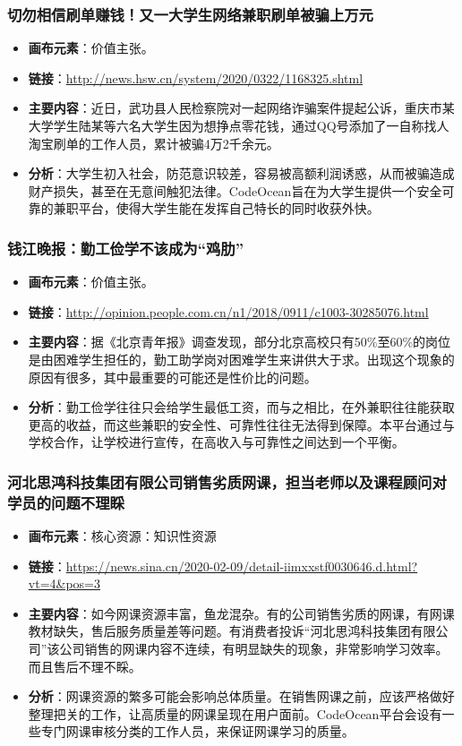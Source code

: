 \documentclass[a4paper]{ctexart}
\begin{document}
\subsubsection{切勿相信刷单赚钱！又一大学生网络兼职刷单被骗上万元}
\begin{itemize}
  \item \textbf{画布元素}：价值主张。
  \item \textbf{链接}：\url{http://news.hsw.cn/system/2020/0322/1168325.shtml}
  \item \textbf{主要内容}：近日，武功县人民检察院对一起网络诈骗案件提起公诉，重庆市某大学学生陆某等六名大学生因为想挣点零花钱，通过QQ号添加了一自称找人淘宝刷单的工作人员，累计被骗4万2千余元。
  \item \textbf{分析}：大学生初入社会，防范意识较差，容易被高额利润诱惑，从而被骗造成财产损失，甚至在无意间触犯法律。CodeOcean旨在为大学生提供一个安全可靠的兼职平台，使得大学生能在发挥自己特长的同时收获外快。
\end{itemize}

\subsubsection{钱江晚报：勤工俭学不该成为“鸡肋”}
\begin{itemize}
  \item \textbf{画布元素}：价值主张。
  \item \textbf{链接}：\url{http://opinion.people.com.cn/n1/2018/0911/c1003-30285076.html}
  \item \textbf{主要内容}：据《北京青年报》调查发现，部分北京高校只有50\%至60\%的岗位是由困难学生担任的，勤工助学岗对困难学生来讲供大于求。出现这个现象的原因有很多，其中最重要的可能还是性价比的问题。
  \item \textbf{分析}：勤工俭学往往只会给学生最低工资，而与之相比，在外兼职往往能获取更高的收益，而这些兼职的安全性、可靠性往往无法得到保障。本平台通过与学校合作，让学校进行宣传，在高收入与可靠性之间达到一个平衡。
\end{itemize}

\subsubsection{河北思鸿科技集团有限公司销售劣质网课，担当老师以及课程顾问对学员的问题不理睬}
\begin{itemize}
  \item \textbf{画布元素}：核心资源：知识性资源
  \item \textbf{链接}：\url{https://news.sina.cn/2020-02-09/detail-iimxxstf0030646.d.html?vt=4&pos=3}
  \item \textbf{主要内容}：如今网课资源丰富，鱼龙混杂。有的公司销售劣质的网课，有网课教材缺失，售后服务质量差等问题。有消费者投诉“河北思鸿科技集团有限公司”该公司销售的网课内容不连续，有明显缺失的现象，非常影响学习效率。而且售后不理不睬。
  \item \textbf{分析}：网课资源的繁多可能会影响总体质量。在销售网课之前，应该严格做好整理把关的工作，让高质量的网课呈现在用户面前。CodeOcean平台会设有一些专门网课审核分类的工作人员，来保证网课学习的质量。
\end{itemize}
\end{document}
